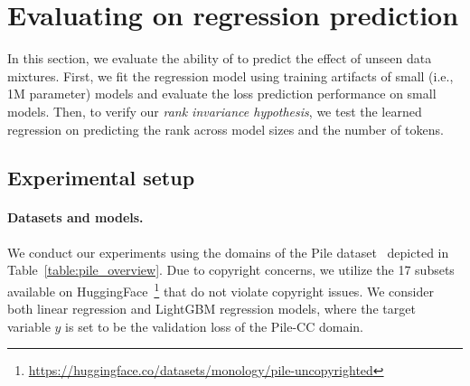 \section{Evaluating on regression prediction}

\label{sec:evaluate_regression}

In this section, we evaluate the ability of \ourmethod to predict the effect of unseen data mixtures.
First, we fit the regression model using training artifacts of small (i.e., 1M parameter) models and evaluate the loss prediction performance on small models.
Then, to verify our \textit{rank invariance hypothesis}, we test the learned regression on predicting the rank across model sizes and the number of tokens.


\subsection{Experimental setup}

\paragraph{Datasets and models.}
We conduct our experiments using the domains of the Pile dataset~\citep{the_pile_corpus} depicted in Table~\ref{table:pile_overview}.
Due to copyright concerns, we utilize the 17 subsets available on HuggingFace~\footnote{\url{https://huggingface.co/datasets/monology/pile-uncopyrighted}} that do not violate copyright issues.
We consider both linear regression and LightGBM regression models, where the target variable $y$ is set to be the validation loss of the Pile-CC domain.


\begin{table}[t]
    \centering
    \small
    \caption{We fit the regression model based on the results of the $512 \times$ 1M models trained on 1B tokens, and evaluate it on \textbf{unseen data mixtures} for 1M, 60M, and 1B parameter models depicted below. Pearson's $r$ and MSE measure the loss prediction performance, while the Spearman correlation $\rho$ compares the predicted and actual ranks.}
    \label{tab:linear_vs_lightgbm}
    \vspace{1mm}
\end{table}

